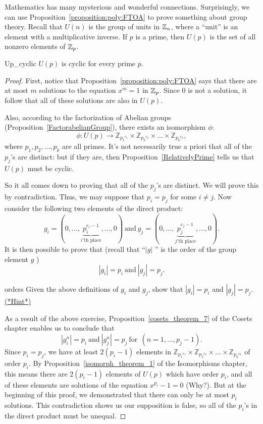 Mathematics has many mysterious and wonderful connections. Surprisingly, we can use Proposition~\ref{proposition:poly:FTOA} to prove something about group theory.  
Recall that $U(n)$ is the group of units in $\mathbb{Z}_n$, where a ``unit'' is an element with a multiplicative inverse. If $p$ is a prime, then $U(p)$ is the set of all nonzero elements of $\mathbb{Z}_p$. 

\begin {prop}{Up_cyclic}
$U(p)$ is cyclic for every prime $p$.
\end {prop}
\begin {proof}
First, notice that Proposition~\ref{proposition:poly:FTOA} says that there are at most $m$ solutions to the equation $x^m = 1$ in $\mathbb{Z}_p$. Since 0 is not a solution, it follow that all of these solutions are also in $U(p)$.

Also, according to the factorization of Abelian groups (Proposition~\ref{FactorabelianGroup}), there exists an isomorphism $\phi$:
\[\phi: U(p)  \rightarrow {\mathbb{Z}_{{p_1}^{e_1}}}  \times   {\mathbb{Z}_{{p_2}^{e_2}}}  \times  ... \times   {\mathbb{Z}_{{p_k}^{e_k}}},\]
where $p_1, p_2, \ldots, p_k$ are all primes.  It's not necessarily true a priori  that all of the $p_j$'s are distinct: but if they are, then Proposition~\ref{RelativelyPrime} tells us that $U(p)$ must be cyclic. 

So it all comes down to proving that all of the $p_j$'s are distinct. We will prove this by contradiction. Thus, we may suppose that $p_i = p_j$ for some $i \neq j$. 
Now consider the following two elements of the direct product:
\[
g_i = ( 0, \ldots ,\underbrace{p_i^{e_i-1}}_{i'\text{th place}},\ldots,0) \mathrm{~ and ~} g_j = ( 0, \ldots ,\underbrace{p_j^{e_j-1}}_{j'\text{th place}},\ldots,0).
\]
It is then possible to prove that (recall that ``$|g|$ '' is the order of the group element $g$ )
\[ |g_i| = p_i \mathrm{~ and ~}  |g_j| = p_j. \]

\begin{exercise}{orders}
Given the above definitions of $g_i$ and $g_j$, show that   $|g_i| = p_i$ and  $|g_j| = p_j$.
\hyperref[sec:polyrings:hints]{(*Hint*)} 
\end{exercise}
As a result of the above exercise, Proposition~\ref{cosets_theorem_7} of the Cosets chapter  enables us to conclude that 
\[
|g_i^n| = p_i \mathrm{~ and ~} |g_j^n| = p_j \mathrm{~ for~~} (n = 1,...,p_j-1).
\]
Since $p_i = p_j$, we have at least $2(p_i-1)$ elements in ${\mathbb{Z}_{{p_1}^{e_1}}}  \times   {\mathbb{Z}_{{p_2}^{e_2}}}  \times  ... \times   {\mathbb{Z}_{{p_k}^{e_k}}}$ of order $p_i$. By 
Proposition~\ref{isomorph_theorem_1} of the Isomorphisms chapter, this means there are  $2(p_i-1)$ elements of $U(p)$ which have order $p_i$, and all of these elements are solutions of the equation $x^{p_i}-1=0$ (Why?). 
But at the beginning of this proof, we demonstrated that there can only be at most $p_i$ solutions. This contradiction shows us our supposition is false, so all of the $p_i$'s in the direct product must be unequal.
\end{proof}
